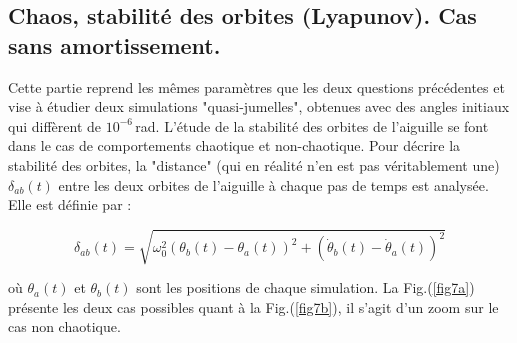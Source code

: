 \documentclass[a4paper,12pt,twoside]{article}
\begin{document}
\vspace{-0.4cm}

\subsection{Chaos, stabilité des orbites (Lyapunov). Cas sans amortissement.}

\vspace{-0.2cm}

Cette partie reprend les mêmes paramètres que les deux questions précédentes et vise à étudier deux simulations "quasi-jumelles", obtenues avec des angles initiaux qui diffèrent de $10^{-6}$\,rad. L'étude de la stabilité des orbites de l'aiguille se font dans le cas de comportements chaotique et non-chaotique. Pour décrire la stabilité des orbites, la "distance" (qui en réalité n'en est pas véritablement une) $\delta_{ab}(t)$ entre les deux orbites de l'aiguille à chaque pas de temps est analysée. Elle est définie par :



\[
\delta_{ab}(t) = \sqrt{\omega^2_0 (\theta_b(t) - \theta_a(t))^2 + (\dot{\theta}_b(t) - \dot{\theta}_a(t))^2}
\]



\noindent où $\theta_a(t)$ et $\theta_b(t)$ sont les positions de chaque simulation. La Fig.(\ref{fig7a}) présente les deux cas possibles quant à la Fig.(\ref{fig7b}), il s'agit d'un zoom sur le cas non chaotique. 
\end{document}
